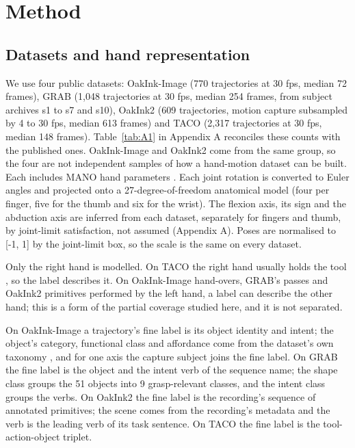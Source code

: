 \documentclass[10pt]{article}
\begin{document}
\section{Method}

\subsection{Datasets and hand representation}

We use four public datasets: OakInk-Image \citep{yang2022oakink} (770 trajectories at 30 fps, median 72 frames), GRAB \citep{taheri2020grab} (1,048 trajectories at 30 fps, median 254 frames, from subject archives s1 to s7 and s10), OakInk2 \citep{zhan2024oakink2} (609 trajectories, motion capture subsampled by 4 to 30 fps, median 613 frames) and TACO \citep{liu2024taco} (2,317 trajectories at 30 fps, median 148 frames). Table~\ref{tab:A1} in Appendix A reconciles these counts with the published ones. OakInk-Image and OakInk2 come from the same group, so the four are not independent samples of how a hand-motion dataset can be built. Each includes MANO hand parameters \citep{romero2017embodied}. Each joint rotation is converted to Euler angles and projected onto a 27-degree-of-freedom anatomical model (four per finger, five for the thumb and six for the wrist). The flexion axis, its sign and the abduction axis are inferred from each dataset, separately for fingers and thumb, by joint-limit satisfaction, not assumed (Appendix A). Poses are normalised to [-1, 1] by the joint-limit box, so the scale is the same on every dataset.

Only the right hand is modelled. On TACO the right hand usually holds the tool \citep{liu2024taco}, so the label describes it. On OakInk-Image hand-overs, GRAB's passes and OakInk2 primitives performed by the left hand, a label can describe the other hand; this is a form of the partial coverage studied here, and it is not separated.

On OakInk-Image a trajectory's fine label is its object identity and intent; the object's category, functional class and affordance come from the dataset's own taxonomy \citep{yang2022oakink}, and for one axis the capture subject joins the fine label. On GRAB the fine label is the object and the intent verb of the sequence name; the shape class groups the 51 objects into 9 grasp-relevant classes, and the intent class groups the verbs. On OakInk2 the fine label is the recording's sequence of annotated primitives; the scene comes from the recording's metadata and the verb is the leading verb of its task sentence. On TACO the fine label is the tool-action-object triplet.
\end{document}
